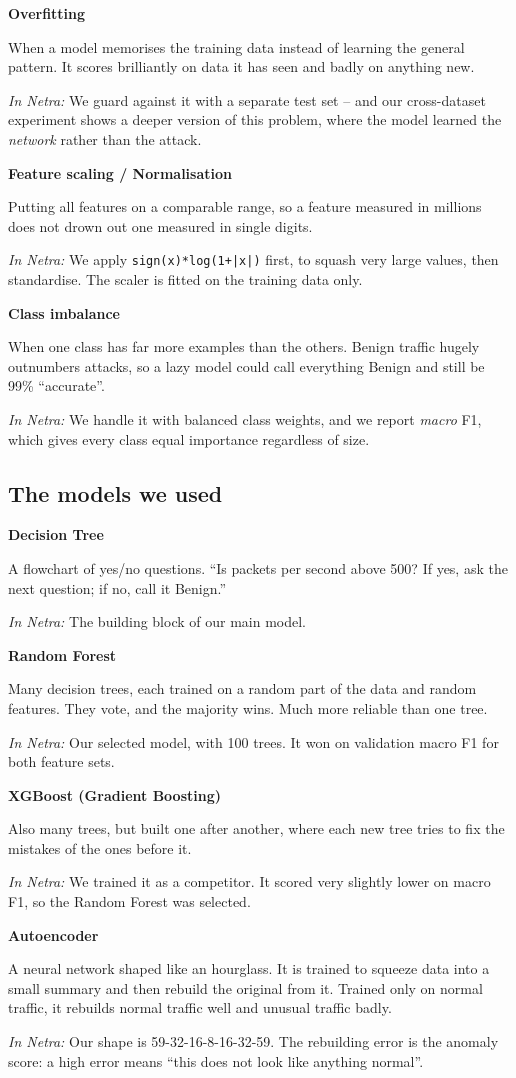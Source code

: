 \documentclass[11pt,a4paper]{article}
\newcommand{\term}[3]{%
  \par\medskip\noindent\textbf{\color{ink}#1}\par
  \nobreak\vspace{1pt}#2\par
  \nobreak\vspace{1pt}\textit{\color{accent}In Netra:} #3\par}
\begin{document}
\term{Overfitting}
{When a model memorises the training data instead of learning the general pattern.
It scores brilliantly on data it has seen and badly on anything new.}
{We guard against it with a separate test set -- and our cross-dataset experiment
shows a deeper version of this problem, where the model learned the \emph{network}
rather than the attack.}

\term{Feature scaling / Normalisation}
{Putting all features on a comparable range, so a feature measured in millions
does not drown out one measured in single digits.}
{We apply \texttt{sign(x)*log(1+|x|)} first, to squash very large values, then
standardise. The scaler is fitted on the training data only.}

\term{Class imbalance}
{When one class has far more examples than the others. Benign traffic hugely
outnumbers attacks, so a lazy model could call everything Benign and still be
99\% ``accurate''.}
{We handle it with balanced class weights, and we report \emph{macro} F1, which
gives every class equal importance regardless of size.}

\subsection{The models we used}

\term{Decision Tree}
{A flowchart of yes/no questions. ``Is packets per second above 500? If yes, ask
the next question; if no, call it Benign.''}
{The building block of our main model.}

\term{Random Forest}
{Many decision trees, each trained on a random part of the data and random
features. They vote, and the majority wins. Much more reliable than one tree.}
{Our selected model, with 100 trees. It won on validation macro F1 for both
feature sets.}

\term{XGBoost (Gradient Boosting)}
{Also many trees, but built one after another, where each new tree tries to fix
the mistakes of the ones before it.}
{We trained it as a competitor. It scored very slightly lower on macro F1, so the
Random Forest was selected.}

\term{Autoencoder}
{A neural network shaped like an hourglass. It is trained to squeeze data into a
small summary and then rebuild the original from it. Trained only on normal
traffic, it rebuilds normal traffic well and unusual traffic badly.}
{Our shape is 59-32-16-8-16-32-59. The rebuilding error is the anomaly score: a
high error means ``this does not look like anything normal''.}
\end{document}
